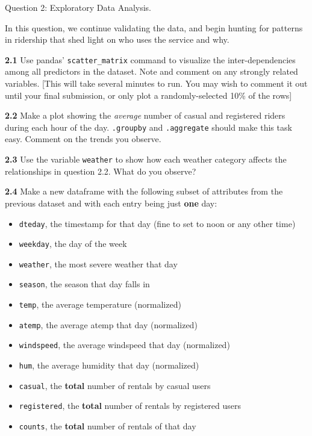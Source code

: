 \documentclass[11pt]{article}
\providecommand{\tightlist}{%
      \setlength{\itemsep}{0pt}\setlength{\parskip}{0pt}}
\begin{document}
     Question 2: Exploratory Data Analysis.

In this question, we continue validating the data, and begin hunting for
patterns in ridership that shed light on who uses the service and why.

\textbf{2.1} Use pandas' \texttt{scatter\_matrix} command to visualize
the inter-dependencies among all predictors in the dataset. Note and
comment on any strongly related variables. {[}This will take several
minutes to run. You may wish to comment it out until your final
submission, or only plot a randomly-selected 10\% of the rows{]}

\textbf{2.2} Make a plot showing the \emph{average} number of casual and
registered riders during each hour of the day. \texttt{.groupby} and
\texttt{.aggregate} should make this task easy. Comment on the trends
you observe.

\textbf{2.3} Use the variable \texttt{weather} to show how each weather
category affects the relationships in question 2.2. What do you observe?

\textbf{2.4} Make a new dataframe with the following subset of
attributes from the previous dataset and with each entry being just
\textbf{one} day:

\begin{itemize}
\tightlist
\item
  \texttt{dteday}, the timestamp for that day (fine to set to noon or
  any other time)
\item
  \texttt{weekday}, the day of the week
\item
  \texttt{weather}, the most severe weather that day
\item
  \texttt{season}, the season that day falls in
\item
  \texttt{temp}, the average temperature (normalized)
\item
  \texttt{atemp}, the average atemp that day (normalized)
\item
  \texttt{windspeed}, the average windspeed that day (normalized)
\item
  \texttt{hum}, the average humidity that day (normalized)
\item
  \texttt{casual}, the \textbf{total} number of rentals by casual users
\item
  \texttt{registered}, the \textbf{total} number of rentals by
  registered users
\item
  \texttt{counts}, the \textbf{total} number of rentals of that day
\end{itemize}
\end{document}
